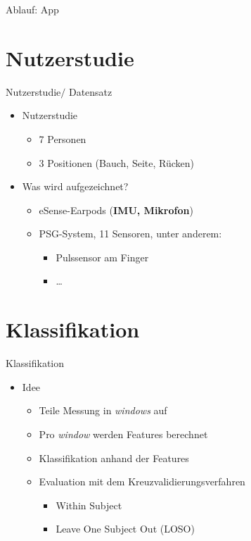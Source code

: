 \documentclass[18pt]{beamer}
\begin{document}
\begin{frame} {Ablauf: App}
\end{frame}

\section{Nutzerstudie}
\begin{frame}{Nutzerstudie$/$ Datensatz}
\begin{itemize}
    \item Nutzerstudie
    \begin{itemize}
        \item 7 Personen 
        \item 3 Positionen (Bauch, Seite, Rücken)
    \end{itemize}
    \item Was wird aufgezeichnet?
    \begin{itemize}
        \item eSense-Earpods (\textbf{IMU, Mikrofon})
        \item PSG-System, 11 Sensoren, unter anderem:
        \begin{itemize}
            \item Pulssensor am Finger
            \item \dots {}
        \end{itemize}
    \end{itemize}
\end{itemize}
\end{frame}

\section{Klassifikation}
\begin{frame}{Klassifikation}
\begin{itemize}
    \item Idee
    \begin{itemize}
        \item Teile Messung in \textit{windows} auf
        \item Pro \textit{window} werden Features berechnet
        \item Klassifikation anhand der Features
    \end{itemize}
    \begin{itemize}
        \item Evaluation mit dem Kreuzvalidierungsverfahren
        \begin{itemize}
            \item Within Subject
            \item Leave One Subject Out (LOSO)
        \end{itemize}
    \end{itemize}
\end{itemize}
\end{frame}
\end{document}
